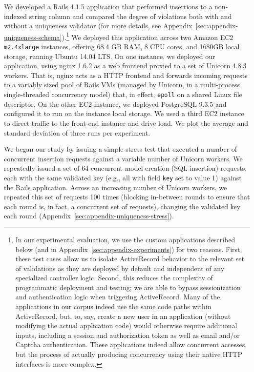  We developed a Rails 4.1.5 application that
performed insertions to a non-indexed string column and compared the
degree of violations both with and without a uniqueness validator (for
more details, see Appendix~\ref{sec:appendix-uniqueness-schema}).\footnote{In our experimental evaluation, we use the custom
  applications described below (and in
  Appendix~\ref{sec:appendix-experiments}) for two reasons. First,
  these test cases allow us to isolate ActiveRecord behavior to the
  relevant set of validations as they are deployed by default and
  independent of any specialized controller logic. Second, this
  reduces the complexity of programmatic deployment and testing; we
  are able to bypass sessionization and authentication logic when
  triggering ActiveRecord. Many of the applications in our corpus
  indeed use the same code paths within ActiveRecord, but, to, say,
  create a new user in an application (without modifying the actual application code)
  would otherwise require additional inputs, including a session and
  authorization token as well as email and/or Captcha
  authentication. These applications indeed allow concurrent accesses,
  but the process of actually producing concurrency using their native
  HTTP interfaces is more complex.} We
deployed this application across two Amazon EC2 \texttt{m2.4xlarge}
instances, offering 68.4 GB RAM, 8 CPU cores, and 1680GB local
storage, running Ubuntu 14.04 LTS. On one instance, we deployed our
application, using nginx 1.6.2 as a web frontend proxied to a set of
Unicorn 4.8.3 workers. That is, nginx acts as a HTTP frontend and
forwards incoming requests to a variably sized pool of Rails VMs
(managed by Unicorn, in a multi-process single-threaded concurrency
model) that, in effect, \texttt{epoll} on a shared Linux file
descriptor. On the other EC2 instance, we deployed PostgreSQL 9.3.5
and configured it to run on the instance local storage. We used a
third EC2 instance to direct traffic to the front-end instance and
drive load. We plot the average and standard deviation of three runs
per experiment.

 We began our study by issuing a simple stress
test that executed a number of concurrent insertion requests against a
variable number of Unicorn workers. We repeatedly issued a set of 64
concurrent model creation (SQL insertion) requests, each with the same
validated key (e.g., all with field \texttt{key} set to value 1)
against the Rails application. Across an increasing number of Unicorn
workers, we repeated this set of requests 100 times (blocking
in-between rounds to ensure that each round is, in fact, a concurrent
set of requests), changing the validated key each round
(Appendix~\ref{sec:appendix-uniqueness-stress}).


